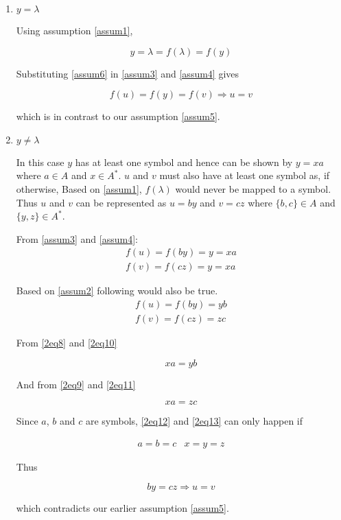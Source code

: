 \begin{enumerate}[label=(\alph*)]

\item
$y = \lambda$

Using assumption \eqref{assum1},

\begin{equation}\label{assum6}
y=\lambda=f(\lambda)=f(y)
\end{equation}

Substituting \eqref{assum6} in \eqref{assum3} and \eqref{assum4} gives

\begin{equation}
f(u) = f(y) = f(v) \Rightarrow u = v
\end{equation}

which is in contrast to our assumption \eqref{assum5}.

\item
$y \neq \lambda$

In this case $y$ has at least one symbol and hence can be shown by $y=xa$ where $a \in A$ and $x \in A^*$.
$u$ and $v$ must also have at least one symbol as, if otherwise, Based on \eqref{assum1}, $f(\lambda)$ would never be mapped to a symbol.
Thus $u$ and $v$ can be represented as $u = by$ and $v = cz$ where $\{b,c\}\in A$ and $\{y,z\}\in A^*$.

From \eqref{assum3} and \eqref{assum4}:
\begin{eqnarray}
f(u) = f(by) = y = xa \label{2eq8}\\
f(v) = f(cz) = y = xa \label{2eq9}
\end{eqnarray}

Based on \eqref{assum2} following would also be true.
\begin{eqnarray}
f(u) = f(by) = yb \label{2eq10}\\
f(v) = f(cz) = zc \label{2eq11}
\end{eqnarray}

From \eqref{2eq8} and \eqref{2eq10}

\begin{equation}\label{2eq12}
xa = yb
\end{equation}

And from \eqref{2eq9} and \eqref{2eq11}

\begin{equation}\label{2eq13}
xa = zc
\end{equation}

Since $a$, $b$ and $c$ are symbols, \eqref{2eq12} and \eqref{2eq13} can only happen if

\begin{eqnarray}
a = b = c & x = y = z
\end{eqnarray}

Thus

\begin{equation}
by = cz \Rightarrow u = v
\end{equation}

which contradicts our earlier assumption \eqref{assum5}.

\end{enumerate}


